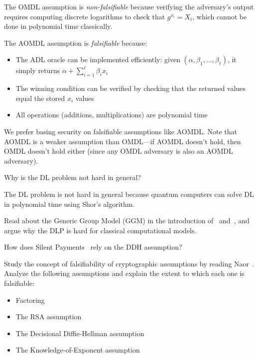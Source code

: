 \ifsolutions
\begin{mysolution}
  The OMDL assumption is \emph{non-falsifiable} because verifying the adversary's output requires computing discrete logarithms to check that $g^{x_i} = X_i$, which cannot be done in polynomial time classically.

  The AOMDL assumption is \emph{falsifiable} because:
  \begin{itemize}
    \item The ADL oracle can be implemented efficiently: given $(\alpha, \beta_1, \ldots, \beta_\ell)$, it simply returns $\alpha + \sum_{i=1}^\ell \beta_i x_i$
    \item The winning condition can be verified by checking that the returned values equal the stored $x_i$ values
    \item All operations (additions, multiplications) are polynomial time
  \end{itemize}

  We prefer basing security on falsifiable assumptions like AOMDL. Note that AOMDL is a weaker assumption than OMDL---if AOMDL doesn't hold, then OMDL doesn't hold either (since any OMDL adversary is also an AOMDL adversary).
\end{mysolution}
\fi

\begin{exercise}[Optional]
  Why is the DL problem not hard in general?
\end{exercise}

\ifsolutions
\begin{mysolution}
  The DL problem is not hard in general because quantum computers can solve DL in polynomial time using Shor's algorithm.
\end{mysolution}
\fi

\begin{exercise}[Optional]
  Read about the Generic Group Model (GGM) in the introduction of~\cite{EC:Shoup97} and~\cite{IMA:Maurer05}, and argue why the DLP is hard for classical computational models.
\end{exercise}

\begin{exercise}[Optional]
  How does Silent Payments~\cite{add:bip-silentpayments} rely on the DDH assumption?
\end{exercise}

\begin{exercise}[Optional]
  Study the concept of falsifiability of cryptographic assumptions by reading Naor~\cite{C:Naor03}.
  Analyze the following assumptions and explain the extent to which each one is falsifiable:
  \begin{itemize}
    \item Factoring
    \item The RSA assumption
    \item The Decisional Diffie-Hellman assumption
    \item The Knowledge-of-Exponent assumption
  \end{itemize}
\end{exercise}
